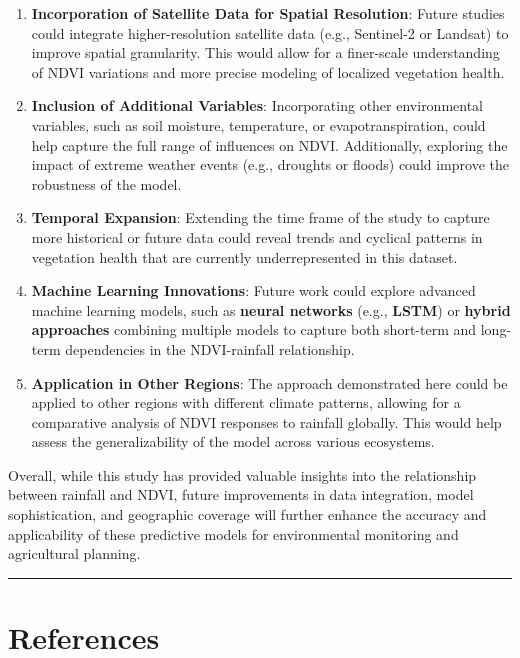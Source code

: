 \documentclass[
]{article}
\begin{document}
\begin{enumerate}
\def\labelenumi{\arabic{enumi}.}
\item
  \textbf{Incorporation of Satellite Data for Spatial Resolution}:
  Future studies could integrate higher-resolution satellite data (e.g.,
  Sentinel-2 or Landsat) to improve spatial granularity. This would
  allow for a finer-scale understanding of NDVI variations and more
  precise modeling of localized vegetation health.
\item
  \textbf{Inclusion of Additional Variables}: Incorporating other
  environmental variables, such as soil moisture, temperature, or
  evapotranspiration, could help capture the full range of influences on
  NDVI. Additionally, exploring the impact of extreme weather events
  (e.g., droughts or floods) could improve the robustness of the model.
\item
  \textbf{Temporal Expansion}: Extending the time frame of the study to
  capture more historical or future data could reveal trends and
  cyclical patterns in vegetation health that are currently
  underrepresented in this dataset.
\item
  \textbf{Machine Learning Innovations}: Future work could explore
  advanced machine learning models, such as \textbf{neural networks}
  (e.g., \textbf{LSTM}) or \textbf{hybrid approaches} combining multiple
  models to capture both short-term and long-term dependencies in the
  NDVI-rainfall relationship.
\item
  \textbf{Application in Other Regions}: The approach demonstrated here
  could be applied to other regions with different climate patterns,
  allowing for a comparative analysis of NDVI responses to rainfall
  globally. This would help assess the generalizability of the model
  across various ecosystems.
\end{enumerate}

Overall, while this study has provided valuable insights into the
relationship between rainfall and NDVI, future improvements in data
integration, model sophistication, and geographic coverage will further
enhance the accuracy and applicability of these predictive models for
environmental monitoring and agricultural planning.

\begin{center}\rule{0.5\linewidth}{0.5pt}\end{center}

\section{References}\label{references}
\end{document}
